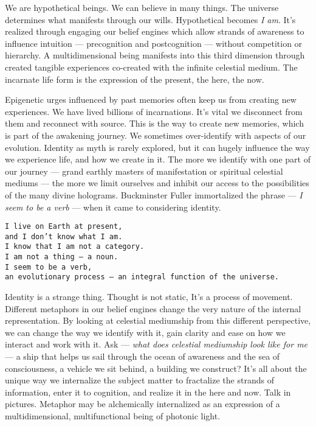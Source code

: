 We are hypothetical beings. We can believe in many things. The universe
determines what manifests through our wills. Hypothetical becomes
\emph{I am}. It's realized through engaging our belief engines which
allow strands of awareness to influence intuition --- precognition and
postcognition --- without competition or hierarchy. A multidimensional
being manifests into this third dimension through created tangible
experiences co-created with the infinite celestial medium. The incarnate
life form is the expression of the present, the here, the now.

Epigenetic urges influenced by past memories often keep us from creating
new experiences. We have lived billions of incarnations. It's vital we
disconnect from them and reconnect with source. This is the way to
create new memories, which is part of the awakening journey. We
sometimes over-identify with aspects of our evolution. Identity as myth
is rarely explored, but it can hugely influence the way we experience
life, and how we create in it. The more we identify with one part of our
journey --- grand earthly masters of manifestation or spiritual
celestial mediums --- the more we limit ourselves and inhibit our access
to the possibilities of the many divine holograms. Buckminster Fuller
immortalized the phrase --- \emph{I seem to be a verb} --- when it came
to considering identity.

\begin{verbatim}
I live on Earth at present,
and I don’t know what I am.
I know that I am not a category.
I am not a thing — a noun.
I seem to be a verb,
an evolutionary process — an integral function of the universe.
\end{verbatim}

Identity is a strange thing. Thought is not static, It's a process of
movement. Different metaphors in our belief engines change the very
nature of the internal representation. By looking at celestial
mediumship from this different perspective, we can change the way we
identify with it, gain clarity and ease on how we interact and work with
it. Ask --- \emph{what does celestial mediumship look like for me} --- a
ship that helps us sail through the ocean of awareness and the sea of
consciousness, a vehicle we sit behind, a building we construct? It's
all about the unique way we internalize the subject matter to fractalize
the strands of information, enter it to cognition, and realize it in the
here and now. Talk in pictures. Metaphor may be alchemically
internalized as an expression of a multidimensional, multifunctional
being of photonic light.


